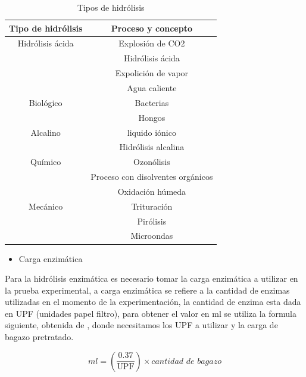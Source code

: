 \documentclass[12pt]{article}
\begin{document}
		\begin{table}[H]
			\centering  
			\caption{Tipos de hidrólisis }%
			\label{tipos de hidrolisis}
		\begin{tabular}{  | c | c |}
			\hline \textbf{Tipo de hidrólisis} &\textbf{ Proceso y concepto}\\ \hline 
			Hidrólisis ácida   &   Explosión de CO2  \\ 
			
			&   Hidrólisis ácida \\ \hline 
			
			
			& Expolición de vapor\\
			&  Agua caliente \\ \hline
			Biológico & Bacterias \\
			&  Hongos \\ \hline
			Alcalino  & liquido iónico  \\
			& Hidrólisis alcalina \\ \hline
			Químico   & Ozonólisis\\
			&  Proceso con disolventes orgánicos\\
			& Oxidación húmeda \\ \hline
			Mecánico  & Trituración \\
			&  Pirólisis \\
			&  Microondas \\ \hline
			
		\end{tabular}
		\label{tipos de pretratamientos}
		\end{table}
		
		
		
		\begin{itemize}
		\item  Carga enzimática
		\end{itemize}
		
		Para la hidrólisis enzimática es necesario tomar la carga enzimática a utilizar en la prueba experimental, a carga enzimática se refiere a la cantidad de enzimas utilizadas en el momento de la experimentación, la cantidad de enzima esta dada en UPF (unidades papel filtro),  para obtener el valor en ml se utiliza la formula siguiente, obtenida de \cite{Arturo2022evaluacion}, donde necesitamos los UPF a utilizar y la carga de bagazo pretratado.
		
			\begin{equation}
			 ml = \left( \frac{0.37}{\text{UPF}} \right) \times \textit{cantidad de bagazo} 
			\end{equation}
		
\end{document}
